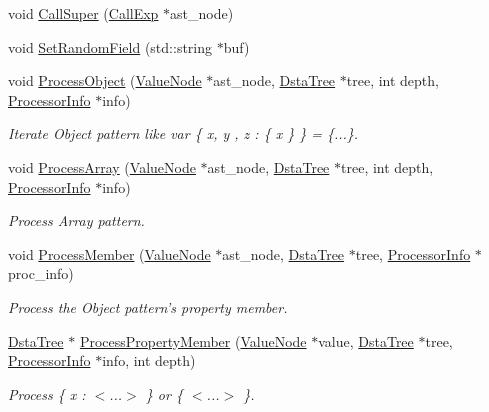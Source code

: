 \begin{DoxyCompactItemize}
void \hyperlink{namespacemocha_aa3b0a7e9d98e260a9c2db8234bef9152}{CallSuper} (\hyperlink{classmocha_1_1_call_exp}{CallExp} $\ast$ast\_\-node)
\item 
void \hyperlink{namespacemocha_a79060cf4d30b639a13e9fa47788a57e4}{SetRandomField} (std::string $\ast$buf)
\item 
void \hyperlink{namespacemocha_a52d7a3f3bf8de146d1e05760aa7463dc}{ProcessObject} (\hyperlink{classmocha_1_1_value_node}{ValueNode} $\ast$ast\_\-node, \hyperlink{classmocha_1_1_dsta_tree}{DstaTree} $\ast$tree, int depth, \hyperlink{classmocha_1_1_processor_info}{ProcessorInfo} $\ast$info)
\begin{DoxyCompactList}\small\item\em Iterate Object pattern like var \{ x, y , z : \{ x \} \} = \{...\}. \end{DoxyCompactList}\item 
void \hyperlink{namespacemocha_ae7216e54bbad37a8eb20cdf819e3cc0b}{ProcessArray} (\hyperlink{classmocha_1_1_value_node}{ValueNode} $\ast$ast\_\-node, \hyperlink{classmocha_1_1_dsta_tree}{DstaTree} $\ast$tree, int depth, \hyperlink{classmocha_1_1_processor_info}{ProcessorInfo} $\ast$info)
\begin{DoxyCompactList}\small\item\em Process Array pattern. \end{DoxyCompactList}\item 
void \hyperlink{namespacemocha_adb1a85a8064e46a4ad0109ead9aba3e8}{ProcessMember} (\hyperlink{classmocha_1_1_value_node}{ValueNode} $\ast$ast\_\-node, \hyperlink{classmocha_1_1_dsta_tree}{DstaTree} $\ast$tree, \hyperlink{classmocha_1_1_processor_info}{ProcessorInfo} $\ast$proc\_\-info)
\begin{DoxyCompactList}\small\item\em Process the Object pattern's property member. \end{DoxyCompactList}\item 
\hyperlink{classmocha_1_1_dsta_tree}{DstaTree} $\ast$ \hyperlink{namespacemocha_a23f9553bc80e3ea1df3feda5667c0282}{ProcessPropertyMember} (\hyperlink{classmocha_1_1_value_node}{ValueNode} $\ast$value, \hyperlink{classmocha_1_1_dsta_tree}{DstaTree} $\ast$tree, \hyperlink{classmocha_1_1_processor_info}{ProcessorInfo} $\ast$info, int depth)
\begin{DoxyCompactList}\small\item\em Process \{ x : $<$...$>$ \} or \{ $<$...$>$ \}. \end{DoxyCompactList}\item 

\end{DoxyCompactItemize}
